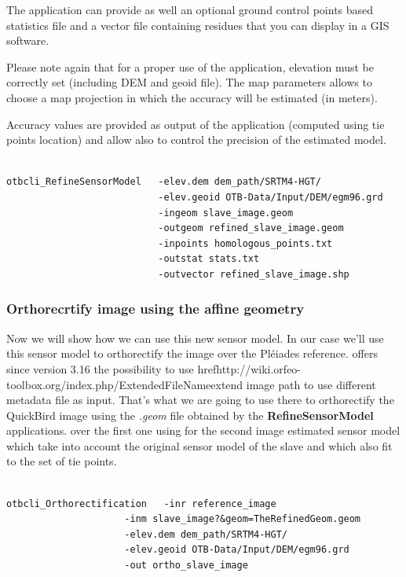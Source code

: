 The application can provide as well an optional ground control points based
statistics file and a vector file containing residues that you can display in a
GIS software.

Please note again that for a proper use of the application, elevation must be
correctly set (including DEM and geoid file). The map parameters allows to
choose a map projection in which the accuracy will be estimated (in meters).

Accuracy values are provided as output of the application (computed using tie
points location) and allow also to control the precision of the estimated model.

\begin{verbatim}

otbcli_RefineSensorModel   -elev.dem dem_path/SRTM4-HGT/
                           -elev.geoid OTB-Data/Input/DEM/egm96.grd
                           -ingeom slave_image.geom
                           -outgeom refined_slave_image.geom
                           -inpoints homologous_points.txt
                           -outstat stats.txt
                           -outvector refined_slave_image.shp

\end{verbatim}

\subsubsection{Orthorecrtify image using the affine geometry}

Now we will show how we can use this new sensor model. In our case we'll use
this sensor model to orthorectify the image over the Pléiades reference. \otb
offers since version 3.16 the possibility to use
href{http://wiki.orfeo-toolbox.org/index.php/ExtendedFileName}{extend image}
path to use different metadata file as input. That's what we are going to use
there to orthorectify the QuickBird image using the \textit{.geom} file obtained
by the \textbf{RefineSensorModel} applications.  over the first one using for
the second image estimated sensor model which take into account the original
sensor model of the slave and which also fit to the set of tie points.

\begin{verbatim}

otbcli_Orthorectification   -inr reference_image
                     -inm slave_image?&geom=TheRefinedGeom.geom
                     -elev.dem dem_path/SRTM4-HGT/
                     -elev.geoid OTB-Data/Input/DEM/egm96.grd
                     -out ortho_slave_image

\end{verbatim}

